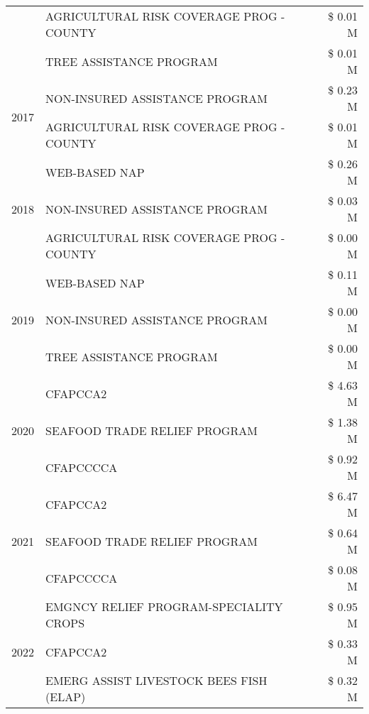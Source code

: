 \begin{tabular}{llr}
 & AGRICULTURAL RISK COVERAGE PROG - COUNTY & \$ 0.01 M \\
 & TREE ASSISTANCE PROGRAM & \$ 0.01 M \\
\cline{1-3}
\multirow[t]{2}{*}{2017} & NON-INSURED ASSISTANCE PROGRAM & \$ 0.23 M \\
 & AGRICULTURAL RISK COVERAGE PROG - COUNTY & \$ 0.01 M \\
\cline{1-3}
\multirow[t]{3}{*}{2018} & WEB-BASED NAP & \$ 0.26 M \\
 & NON-INSURED ASSISTANCE PROGRAM & \$ 0.03 M \\
 & AGRICULTURAL RISK COVERAGE PROG - COUNTY & \$ 0.00 M \\
\cline{1-3}
\multirow[t]{3}{*}{2019} & WEB-BASED NAP & \$ 0.11 M \\
 & NON-INSURED ASSISTANCE PROGRAM & \$ 0.00 M \\
 & TREE ASSISTANCE PROGRAM & \$ 0.00 M \\
\cline{1-3}
\multirow[t]{3}{*}{2020} & CFAPCCA2 & \$ 4.63 M \\
 & SEAFOOD TRADE RELIEF PROGRAM & \$ 1.38 M \\
 & CFAPCCCCA & \$ 0.92 M \\
\cline{1-3}
\multirow[t]{3}{*}{2021} & CFAPCCA2 & \$ 6.47 M \\
 & SEAFOOD TRADE RELIEF PROGRAM & \$ 0.64 M \\
 & CFAPCCCCA & \$ 0.08 M \\
\cline{1-3}
\multirow[t]{3}{*}{2022} & EMGNCY RELIEF PROGRAM-SPECIALITY CROPS & \$ 0.95 M \\
 & CFAPCCA2 & \$ 0.33 M \\
 & EMERG ASSIST LIVESTOCK BEES FISH (ELAP) & \$ 0.32 M \\
\cline{1-3}
\bottomrule
\end{tabular}
